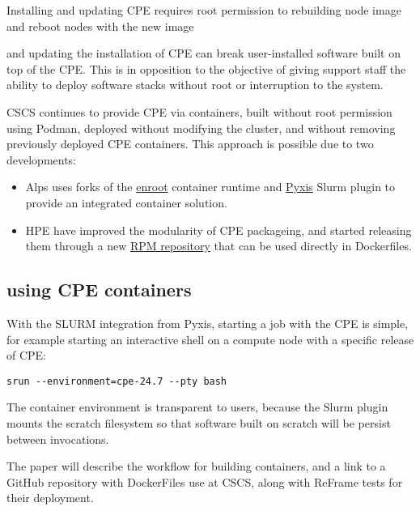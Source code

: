 Installing and updating CPE requires root permission to rebuilding node image and reboot nodes with the new image

and updating the installation of CPE can break user-installed software built on top of the CPE.
This is in opposition to the objective of giving support staff the ability to deploy software stacks without root or interruption to the system.

CSCS continues to provide CPE via containers, built without root permission using Podman, deployed without modifying the cluster, and without removing previously deployed CPE containers.
This approach is possible due to two developments:
\begin{itemize}
       \item Alps uses forks of the \href{https://github.com/NVIDIA/enroot}{enroot} container runtime and \href{https://github.com/NVIDIA/pyxis}{Pyxis} Slurm plugin to provide an integrated container solution.
       \item HPE have improved the modularity of CPE packageing, and started releasing them through a new \href{https://cpe.ext.hpe.com/docs/latest/install/installation-guidance-container.html}{RPM repository} that can be used directly in Dockerfiles.
\end{itemize}

\subsection{using CPE containers}

With the SLURM integration from Pyxis, starting a job with the CPE is simple, for example starting an interactive shell on a compute node with a specific release of CPE:
\begin{lstlisting}
srun --environment=cpe-24.7 --pty bash
\end{lstlisting}
The container environment is transparent to users, because the Slurm plugin mounts the scratch filesystem so that software built on scratch will be persist between invocations.

The paper will describe the workflow for building containers, and a link to a GitHub repository with DockerFiles use at CSCS, along with ReFrame tests for their deployment.
